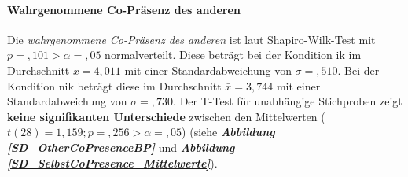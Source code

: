 \documentclass[a4paper,11pt]{article}%
\renewcommand{\\}{\vspace*{0.5\baselineskip} \newline}
\begin{document}
{\paragraph{Wahrgenommene Co-Präsenz des anderen}
Die \textit{wahrgenommene Co-Präsenz des anderen} ist laut Shapiro-Wilk-Test mit $p =,101 > \alpha = ,05$ normalverteilt.
Diese beträgt bei der Kondition \ac{ik} im Durchschnitt $\bar{x} = 4,011$ mit einer Standardabweichung von $\sigma =,510$.
Bei der Kondition \ac{nik} beträgt diese im Durchschnitt $\bar{x} = 3,744$ mit einer Standardabweichung von $\sigma = ,730$. 
Der T-Test für unabhängige Stichproben zeigt \textbf{keine signifikanten Unterschiede} zwischen den Mittelwerten ($t(28) = 1,159; p =,256 > \alpha = ,05$) (siehe \textbf{\textit{Abbildung \ref{SD_OtherCoPresenceBP}}} und \textbf{\textit{Abbildung \ref{SD_SelbstCoPresence_Mittelwerte}}}).

}
\end{document}
